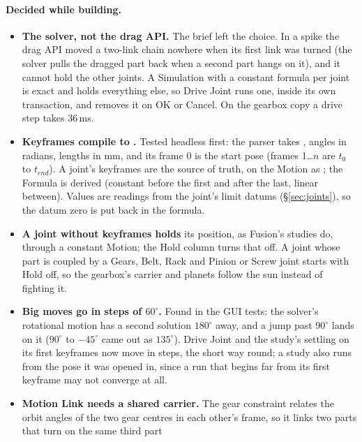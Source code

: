 \paragraph{Decided while building.}
\begin{itemize}[nosep]
  \item \textbf{The solver, not the drag API.} The brief left the choice. In a spike the drag API moved a
        two-link chain nowhere when its first link was turned (the solver pulls the dragged part back
        when a second part hangs on it), and it cannot hold the other joints. A Simulation with a
        constant formula per joint is exact and holds everything else, so Drive Joint runs one, inside its
        own transaction, and removes it on OK or Cancel. On the gearbox copy a drive step takes 36\,ms.
  \item \textbf{Keyframes compile to .} Tested headless first: the parser takes
        , angles in
        radians, lengths in mm, and its frame 0 is the start pose (frames 1\ldots$n$ are $t_0$ to $t_{end}$).
        A joint's keyframes are the source of truth, on the Motion as ; the Formula is
        derived (constant before the first and after the last, linear between). Values are readings from
        the joint's limit datums (\S\ref{sec:joints}), so the datum zero is put back in the formula.
  \item \textbf{A joint without keyframes holds} its position, as Fusion's studies do, through a constant
        Motion; the Hold column turns that off. A joint whose part is coupled by a Gears, Belt, Rack and
        Pinion or Screw joint starts with Hold off, so the gearbox's carrier and planets follow the sun
        instead of fighting it.
  \item \textbf{Big moves go in steps of $60^\circ$.} Found in the GUI tests: the solver's rotational
        motion has a second solution $180^\circ$ away, and a jump past $90^\circ$ lands on it ($90^\circ$
        to $-45^\circ$ came out as $135^\circ$). Drive Joint and the study's settling on its first
        keyframes now move in steps, the short way round; a study also runs from the pose it was opened
        in, since a run that begins far from its first keyframe may not converge at all.
  \item \textbf{Motion Link needs a shared carrier.} The gear constraint relates the orbit angles of the
        two gear centres in each other's frame, so it links two parts that turn on the same third part

\end{itemize}
